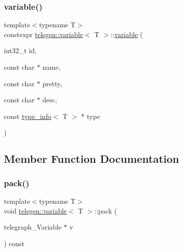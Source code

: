 \subsubsection{\texorpdfstring{variable()}{variable()}}
{\footnotesize\ttfamily template$<$typename T$>$ \\
constexpr \hyperlink{classtelegen_1_1variable}{telegen\+::variable}$<$ T $>$\+::\hyperlink{classtelegen_1_1variable}{variable} (\begin{DoxyParamCaption}\item[{int32\+\_\+t}]{id,  }\item[{const char $\ast$}]{name,  }\item[{const char $\ast$}]{pretty,  }\item[{const char $\ast$}]{desc,  }\item[{const \hyperlink{structtelegen_1_1type__info}{type\+\_\+info}$<$ T $>$ $\ast$}]{type }\end{DoxyParamCaption})\hspace{0.3cm}{\ttfamily [inline]}}



\subsection{Member Function Documentation}
\mbox{\label{classtelegen_1_1variable_aea48d0a504b5839f544099c402373b43}} 
\subsubsection{\texorpdfstring{pack()}{pack()}\hspace{0.1cm}{\footnotesize\ttfamily [1/2]}}
{\footnotesize\ttfamily template$<$typename T$>$ \\
void \hyperlink{classtelegen_1_1variable}{telegen\+::variable}$<$ T $>$\+::pack (\begin{DoxyParamCaption}\item[{telegraph\+\_\+\+Variable $\ast$}]{v }\end{DoxyParamCaption}) const\hspace{0.3cm}{\ttfamily [inline]}}

\mbox{\label{classtelegen_1_1variable_a8a077a32a045a67f049737517be3ea51}} 
